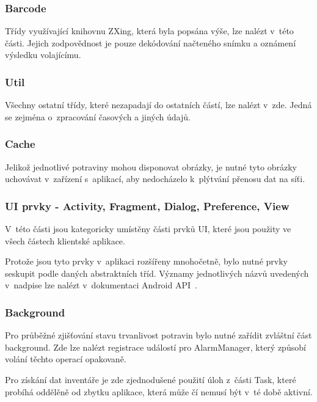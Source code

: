 \documentclass[thesis=B,czech]{FITthesis}[2013/10/20]
\begin{document}
\subsubsection{Barcode}

Třídy využívající knihovnu ZXing, která byla popsána výše, lze nalézt v~této části. Jejich zodpovědnost je pouze dekódování načteného snímku a oznámení výsledku volajícímu.

\subsubsection{Util}

Všechny ostatní třídy, které nezapadají do ostatních částí, lze nalézt v~zde. Jedná se zejména o~zpracování časových a jiných údajů.

\subsubsection{Cache}

Jelikož jednotlivé potraviny mohou disponovat obrázky, je nutné tyto obrázky uchovávat v~zařízení s~aplikací, aby nedocházelo k~plýtvání přenosu dat na síťi.

\subsubsection{UI prvky - Activity, Fragment, Dialog, Preference, View}

V~této části jsou kategoricky umístěny části prvků UI, které jsou použity ve všech částech klientské aplikace.

Protože jsou tyto prvky v~aplikaci rozšířeny mnohočetně, bylo nutné prvky seskupit podle daných abstraktních tříd. Významy jednotlivých názvů uvedených v~nadpise lze nalézt v~dokumentaci Android API~\cite{android_api}. 

\subsubsection{Background}

Pro průběžné zjišťování stavu trvanlivost potravin bylo nutné zařídit zvláštní část background. Zde lze nalézt registrace událostí pro AlarmManager\cite{alarm_manager}, který způsobí volání těchto operací opakovaně.

Pro získání dat inventáře je zde zjednodušené použití úloh z~části Task, které probíhá oddělěně od zbytku aplikace, která může čí nemusí být v~té době aktivní.
\end{document}
